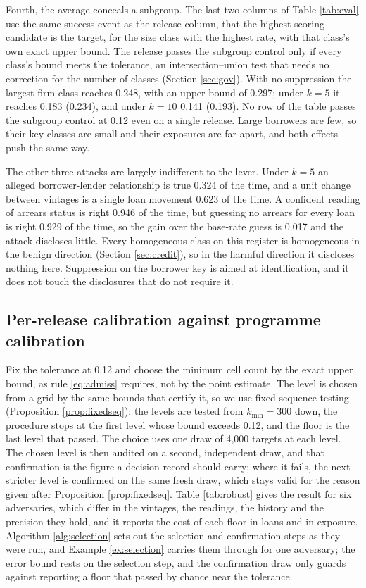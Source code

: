 \documentclass[11pt,a4paper]{article}
\theoremstyle{plain}
\theoremstyle{definition}
\theoremstyle{definition}
\theoremstyle{plain}
\begin{document}
Fourth, the average conceals a subgroup. The last two columns of Table
\ref{tab:eval} use the same success event as the release column, that the
highest-scoring candidate is the target, for the size class with the highest
rate, with that class's own exact upper bound. The release passes the subgroup
control only if every class's bound meets the tolerance, an intersection--union
test that needs no correction for the number of classes (Section \ref{sec:gov}).
With no suppression the largest-firm class reaches 0.248, with an upper bound of
0.297; under $k=5$ it reaches 0.183 (0.234), and under $k=10$ 0.141 (0.193). No
row of the table passes the subgroup control at 0.12 even on a single release.
Large borrowers are few, so their key classes are small and their exposures are
far apart, and both effects push the same way.

The other three attacks are largely indifferent to the lever. Under $k=5$ an alleged
borrower-lender relationship is true 0.324 of the time, and a unit change between
vintages is a single loan movement 0.623 of the time. A confident reading of
arrears status is right 0.946 of the time, but guessing no arrears for every loan
is right 0.929 of the time, so the gain over the base-rate guess is 0.017 and the
attack discloses little. Every homogeneous class on this register is homogeneous
in the benign direction (Section \ref{sec:credit}), so in the harmful direction it
discloses nothing here. Suppression on the borrower key is aimed at identification,
and it does not touch the disclosures that do not require it.

\subsection{Per-release calibration against programme calibration}\label{sec:eval-programme}

Fix the tolerance at 0.12 and choose the minimum cell count by the exact upper
bound, as rule \eqref{eq:admiss} requires, not by the point estimate. The level is
chosen from a grid by the same bounds that certify it, so we use fixed-sequence
testing (Proposition \ref{prop:fixedseq}): the levels are tested from $k_{\min} =
300$ down, the procedure stops at the first level whose bound exceeds 0.12, and
the floor is the last level that passed. The choice uses one draw of 4{,}000
targets at each level. The chosen level is then audited on a second, independent
draw, and that confirmation is the figure a decision record should carry; where
it fails, the next stricter level is confirmed on the same fresh draw, which stays
valid for the reason given after Proposition \ref{prop:fixedseq}. Table
\ref{tab:robust} gives the result for six adversaries, which differ in the
vintages, the readings, the history and the precision they hold, and it reports
the cost of each floor in loans and in exposure. Algorithm \ref{alg:selection}
sets out the selection and confirmation steps as they were run, and Example
\ref{ex:selection} carries them through for one adversary; the error bound
rests on the selection step, and the confirmation draw only guards against
reporting a floor that passed by chance near the tolerance.
\end{document}
